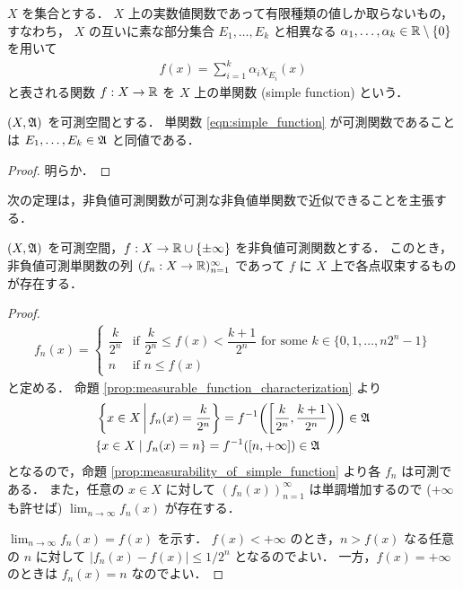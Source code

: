 \begin{definition}
    $X$ を集合とする．
    $X$ 上の実数値関数であって有限種類の値しか取らないもの，すなわち，
    $X$ の互いに素な部分集合 $E_1,\ldots,E_k$ と相異なる $\alpha_1,\ldots,\alpha_k\in\mathbb{R}\setminus\{0\}$ を用いて
    \begin{align}
        f(x)=\sum_{i=1}^k\alpha_i\chi_{E_i}(x)
        \label{eqn:simple_function}
    \end{align}
    と表される関数 $f:X\to\mathbb{R}$ を $X$ 上の単関数 (simple function) という．
\end{definition}

\begin{proposition}\label{prop:measurability_of_simple_function}
    $(X,\mathfrak{A})$ を可測空間とする．
    単関数 \eqref{eqn:simple_function} が可測関数であることは $E_1,\ldots,E_k\in\mathfrak{A}$ と同値である．
\end{proposition}

\begin{proof}
    明らか．
\end{proof}

次の定理は，非負値可測関数が可測な非負値単関数で近似できることを主張する．

\begin{theorem}\label{thm:approx_measurable_by_simple}
    $(X,\mathfrak{A})$ を可測空間，$f:X\to\mathbb{R}\cup\{\pm\infty\}$ を非負値可測関数とする．
    このとき，非負値可測単関数の列 $(f_n:X\to\mathbb{R})_{n=1}^\infty$ であって $f$ に $X$ 上で各点収束するものが存在する．
\end{theorem}

\begin{proof}
    \begin{align*}
        f_n(x)=\begin{cases}
            \dfrac{k}{2^n}&\text{if $\dfrac{k}{2^n}\le f(x)<\dfrac{k+1}{2^n}$ for some $k\in\{0,1,\ldots,n2^n-1\}$}\\
            n&\text{if $n\le f(x)$}
        \end{cases}
    \end{align*}
    と定める．
    命題 \ref{prop:measurable_function_characterization} より
    \begin{align*}
        &\left\{x\in X\,\middle\vert\,f_n(x)=\dfrac{k}{2^n}\right\}
        =f^{-1}\biggl(\biggl[\dfrac{k}{2^n},\dfrac{k+1}{2^n}\biggr)\biggr)\in\mathfrak{A}\\
        &\{x\in X\mid f_n(x)=n\}=f^{-1}([n,+\infty])\in\mathfrak{A}
    \end{align*}
    となるので，命題 \ref{prop:measurability_of_simple_function} より各 $f_n$ は可測である．
    また，任意の $x\in X$ に対して $(f_n(x))_{n=1}^\infty$ は単調増加するので
    ($+\infty$ も許せば) $\displaystyle\lim_{n\to\infty}f_n(x)$ が存在する．

    $\displaystyle\lim_{n\to\infty}f_n(x)=f(x)$ を示す．
    $f(x)<+\infty$ のとき，$n>f(x)$ なる任意の $n$ に対して $|f_n(x)-f(x)|\le1/2^n$ となるのでよい．
    一方，$f(x)=+\infty$ のときは $f_n(x)=n$ なのでよい．
\end{proof}

